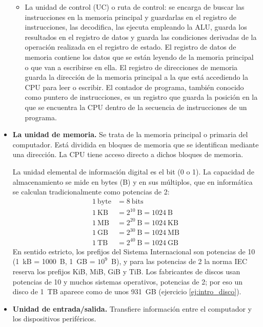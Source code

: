 \begin{paracol}{2}
\begin{itemize}
\begin{itemize}
\item La unidad de control (UC) o ruta de control: se encarga de buscar las instrucciones en la memoria principal y guardarlas en el registro de instrucciones, las decodifica, las ejecuta empleando la ALU, guarda los resultados en el registro de datos y guarda las condiciones derivadas de la operación realizada en el registro de estado. El registro de datos de memoria contiene los datos que se están leyendo de la memoria principal o que van a escribirse en ella. El registro de direcciones de memoria guarda la dirección de la memoria principal a la que está accediendo la CPU para leer o escribir. El contador de programa, también conocido como puntero de instrucciones, es un registro que guarda la posición en la que se encuentra la CPU dentro de la secuencia de instrucciones de un programa.
\end{itemize}

\item \textbf{La unidad de memoria.} Se trata de la memoria principal o primaria del computador. Está dividida en bloques de memoria que se identifican mediante una dirección. La CPU tiene acceso directo a dichos bloques de memoria.

La unidad elemental de información digital es el bit  (0 o 1). La capacidad de almacenamiento se mide en bytes  (B) y en sus múltiplos, que en informática se calculan tradicionalmente como potencias de 2:
\begin{align*}
1\ \text{byte} &= 8\ \text{bits}\\
1\ \text{KB} &= 2^{10}\ \text{B} = 1024\ \text{B}\\
1\ \text{MB} &= 2^{20}\ \text{B} = 1024\ \text{KB}\\
1\ \text{GB} &= 2^{30}\ \text{B} = 1024\ \text{MB}\\
1\ \text{TB} &= 2^{40}\ \text{B} = 1024\ \text{GB}
\end{align*}
En sentido estricto, los prefijos del Sistema Internacional son potencias de 10 (1~kB = 1000~B, 1~GB = $10^9$~B), y para las potencias de 2 la norma IEC reserva los prefijos KiB, MiB, GiB y TiB. Los fabricantes de discos usan potencias de 10 y muchos sistemas operativos, potencias de 2; por eso un disco de 1~TB aparece como de unos 931~GB (ejercicio \ref{ej:intro_disco}).

\item \textbf{Unidad de entrada/salida.} Transfiere información entre el computador y los dispositivos periféricos.
\end{itemize}


\end{paracol}
